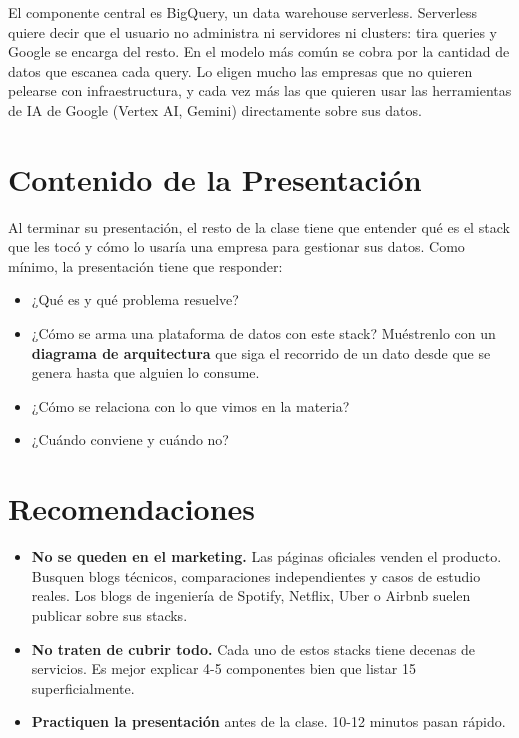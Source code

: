 \documentclass[12pt]{article}
\begin{document}
\bigskip

El componente central es BigQuery, un data warehouse serverless. Serverless quiere decir que el usuario no administra ni servidores ni clusters: tira queries y Google se encarga del resto. En el modelo más común se cobra por la cantidad de datos que escanea cada query. Lo eligen mucho las empresas que no quieren pelearse con infraestructura, y cada vez más las que quieren usar las herramientas de IA de Google (Vertex AI, Gemini) directamente sobre sus datos.

\section{Contenido de la Presentación}

Al terminar su presentación, el resto de la clase tiene que entender qué es el stack que les tocó y cómo lo usaría una empresa para gestionar sus datos. Como mínimo, la presentación tiene que responder:

\begin{itemize}
    \item ¿Qué es y qué problema resuelve?
    \item ¿Cómo se arma una plataforma de datos con este stack? Muéstrenlo con un \textbf{diagrama de arquitectura} que siga el recorrido de un dato desde que se genera hasta que alguien lo consume.
    \item ¿Cómo se relaciona con lo que vimos en la materia?
    \item ¿Cuándo conviene y cuándo no?
\end{itemize}

\section{Recomendaciones}

\begin{itemize}
    \item \textbf{No se queden en el marketing.} Las páginas oficiales venden el producto. Busquen blogs técnicos, comparaciones independientes y casos de estudio reales. Los blogs de ingeniería de Spotify, Netflix, Uber o Airbnb suelen publicar sobre sus stacks.
    \item \textbf{No traten de cubrir todo.} Cada uno de estos stacks tiene decenas de servicios. Es mejor explicar 4-5 componentes bien que listar 15 superficialmente.
    \item \textbf{Practiquen la presentación} antes de la clase. 10-12 minutos pasan rápido.
\end{itemize}
\end{document}

